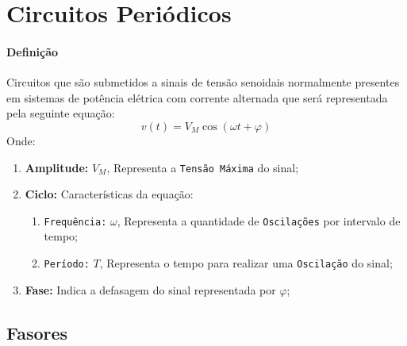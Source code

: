 \documentclass{article}
\begin{document}
\section{Circuitos Periódicos}
    \paragraph{Definição}Circuitos que são submetidos a sinais de tensão senoidais normalmente presentes em sistemas de potência elétrica com corrente alternada que será representada pela seguinte equação:
        \begin{equation}
            \boxed{v(t) = V_{M}\cos(\omega t + \varphi)}
        \end{equation}
    Onde:
        \begin{enumerate}
            \item \textbf{Amplitude:} $V_{M}$, Representa a \texttt{Tensão Máxima} do sinal;

            \item \textbf{Ciclo:} Características da equação:
                \begin{enumerate}[noitemsep, rightmargin = \leftmargin]
                    \item \texttt{Frequência:} $\omega$, Representa a quantidade de \texttt{Oscilações} por intervalo de tempo;

                    \item \texttt{Período:} $T$, Representa o tempo para realizar uma \texttt{Oscilação} do sinal;
                \end{enumerate}

            \item \textbf{Fase:} Indica a defasagem do sinal representada por $\varphi$;
        \end{enumerate}

    \subsection{Fasores}
\end{document}
